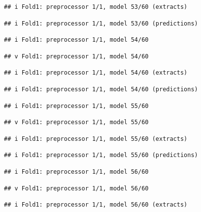 \documentclass[
]{article}
\begin{document}
\begin{verbatim}
## i Fold1: preprocessor 1/1, model 53/60 (extracts)
\end{verbatim}

\begin{verbatim}
## i Fold1: preprocessor 1/1, model 53/60 (predictions)
\end{verbatim}

\begin{verbatim}
## i Fold1: preprocessor 1/1, model 54/60
\end{verbatim}

\begin{verbatim}
## v Fold1: preprocessor 1/1, model 54/60
\end{verbatim}

\begin{verbatim}
## i Fold1: preprocessor 1/1, model 54/60 (extracts)
\end{verbatim}

\begin{verbatim}
## i Fold1: preprocessor 1/1, model 54/60 (predictions)
\end{verbatim}

\begin{verbatim}
## i Fold1: preprocessor 1/1, model 55/60
\end{verbatim}

\begin{verbatim}
## v Fold1: preprocessor 1/1, model 55/60
\end{verbatim}

\begin{verbatim}
## i Fold1: preprocessor 1/1, model 55/60 (extracts)
\end{verbatim}

\begin{verbatim}
## i Fold1: preprocessor 1/1, model 55/60 (predictions)
\end{verbatim}

\begin{verbatim}
## i Fold1: preprocessor 1/1, model 56/60
\end{verbatim}

\begin{verbatim}
## v Fold1: preprocessor 1/1, model 56/60
\end{verbatim}

\begin{verbatim}
## i Fold1: preprocessor 1/1, model 56/60 (extracts)
\end{verbatim}
\end{document}
